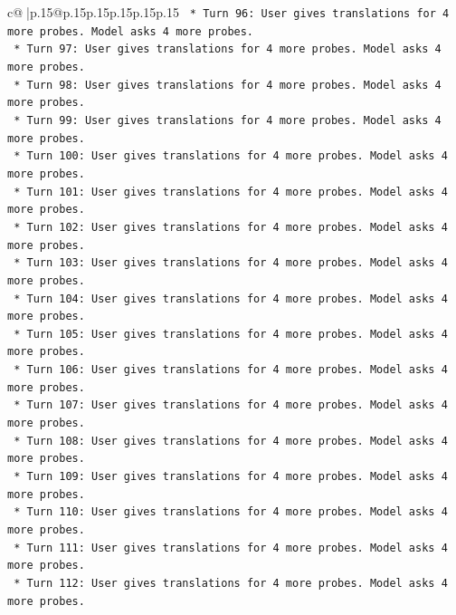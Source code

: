 \documentclass{article}
\begin{document}
{\begin{supertabular}{c@{$\;$}|p{.15\linewidth}@{}p{.15\linewidth}p{.15\linewidth}p{.15\linewidth}p{.15\linewidth}p{.15\linewidth}}
{{{\texttt{                    *   Turn 96: User gives translations for 4 more probes. Model asks 4 more probes.} \\
\texttt{                    *   Turn 97: User gives translations for 4 more probes. Model asks 4 more probes.} \\
\texttt{                    *   Turn 98: User gives translations for 4 more probes. Model asks 4 more probes.} \\
\texttt{                    *   Turn 99: User gives translations for 4 more probes. Model asks 4 more probes.} \\
\texttt{                    *   Turn 100: User gives translations for 4 more probes. Model asks 4 more probes.} \\
\texttt{                    *   Turn 101: User gives translations for 4 more probes. Model asks 4 more probes.} \\
\texttt{                    *   Turn 102: User gives translations for 4 more probes. Model asks 4 more probes.} \\
\texttt{                    *   Turn 103: User gives translations for 4 more probes. Model asks 4 more probes.} \\
\texttt{                    *   Turn 104: User gives translations for 4 more probes. Model asks 4 more probes.} \\
\texttt{                    *   Turn 105: User gives translations for 4 more probes. Model asks 4 more probes.} \\
\texttt{                    *   Turn 106: User gives translations for 4 more probes. Model asks 4 more probes.} \\
\texttt{                    *   Turn 107: User gives translations for 4 more probes. Model asks 4 more probes.} \\
\texttt{                    *   Turn 108: User gives translations for 4 more probes. Model asks 4 more probes.} \\
\texttt{                    *   Turn 109: User gives translations for 4 more probes. Model asks 4 more probes.} \\
\texttt{                    *   Turn 110: User gives translations for 4 more probes. Model asks 4 more probes.} \\
\texttt{                    *   Turn 111: User gives translations for 4 more probes. Model asks 4 more probes.} \\
\texttt{                    *   Turn 112: User gives translations for 4 more probes. Model asks 4 more probes.} \\
}}}
\end{supertabular}}
\end{document}
